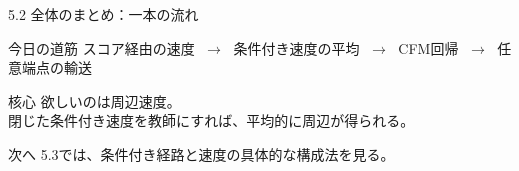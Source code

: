 \asmain
\begin{frame}{5.2 全体のまとめ：一本の流れ}
    \begin{block}{今日の道筋}
        スコア経由の速度
        $\;\to\;$
        条件付き速度の平均
        $\;\to\;$
        CFM回帰
        $\;\to\;$
        任意端点の輸送
    \end{block}
    \begin{block}{核心}
        欲しいのは周辺速度。\\
        閉じた条件付き速度を教師にすれば、平均的に周辺が得られる。
    \end{block}
    \begin{block}{次へ}
        5.3では、条件付き経路と速度の具体的な構成法を見る。
    \end{block}
\end{frame}
